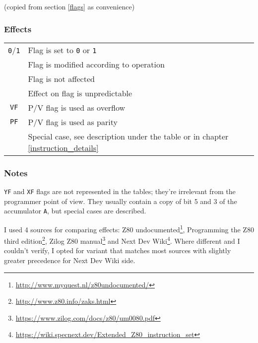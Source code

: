 \documentclass[12pt,twoside,openright,a4paper]{book}
\begin{document}
(copied from section \ref{flags} as convenience)

\subsubsection{Effects}

\begin{tabular}{cl}
	{\tt 0}/{\tt 1} & Flag is set to {\tt 0} or {\tt 1} \\
	{\tt \FS} & Flag is modified according to operation \\
	{\tt \FN} & Flag is not affected \\
	{\tt \FU} & Effect on flag is unpredictable \\
	{\tt VF} & P/V flag is used as overflow \\
	{\tt PF} & P/V flag is used as parity \\
	{\tt \FX} & Special case, see description under the table or in chapter \ref{instruction_details}
\end{tabular}

\subsubsection{Notes}

{\tt YF} and {\tt XF} flags are not represented in the tables; they're irrelevant from the programmer point of view. They usually contain a copy of bit 5 and 3 of the accumulator {\tt A}, but special cases are described.
	
I used 4 sources for comparing effects: Z80 undocumented\footnote{\url{http://www.myquest.nl/z80undocumented/}}, Programming the Z80 third edition\footnote{\url{http://www.z80.info/zaks.html}}, Zilog Z80 manual\footnote{\url{https://www.zilog.com/docs/z80/um0080.pdf}} and Next Dev Wiki\footnote{\url{https://wiki.specnext.dev/Extended_Z80_instruction_set}}. Where different and I couldn't verify, I opted for variant that matches most sources with slightly greater precedence for Next Dev Wiki side.


\pagebreak

\end{document}
